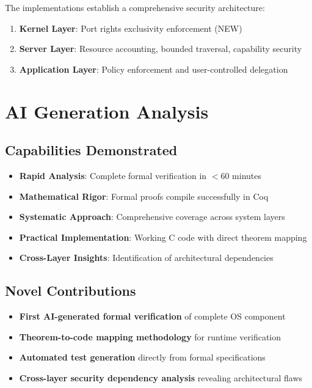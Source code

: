 \documentclass[11pt,a4paper]{article}
\begin{document}
The implementations establish a comprehensive security architecture:

\begin{enumerate}
    \item \textbf{Kernel Layer}: Port rights exclusivity enforcement (NEW)
    \item \textbf{Server Layer}: Resource accounting, bounded traversal, capability security
    \item \textbf{Application Layer}: Policy enforcement and user-controlled delegation
\end{enumerate}

\section{AI Generation Analysis}

\subsection{Capabilities Demonstrated}

\begin{itemize}
    \item \textbf{Rapid Analysis}: Complete formal verification in $<$60 minutes
    \item \textbf{Mathematical Rigor}: Formal proofs compile successfully in Coq
    \item \textbf{Systematic Approach}: Comprehensive coverage across system layers
    \item \textbf{Practical Implementation}: Working C code with direct theorem mapping
    \item \textbf{Cross-Layer Insights}: Identification of architectural dependencies
\end{itemize}

\subsection{Novel Contributions}

\begin{itemize}
    \item \textbf{First AI-generated formal verification} of complete OS component
    \item \textbf{Theorem-to-code mapping methodology} for runtime verification
    \item \textbf{Automated test generation} directly from formal specifications
    \item \textbf{Cross-layer security dependency analysis} revealing architectural flaws
\end{itemize}
\end{document}
